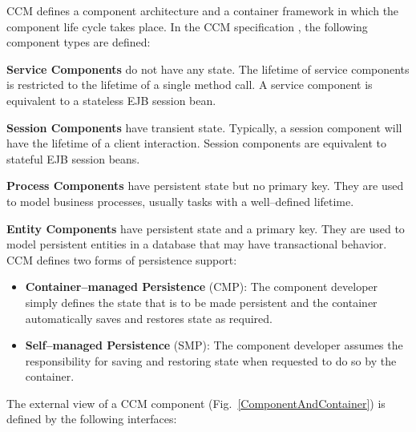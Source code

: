 \noindent
CCM defines a component 
architecture and a container framework in which the component life cycle takes
place. 
In the CCM specification \cite{CCMSpecification}, the following component 
types are defined:
\begin{description}
\item {\bf Service Components} do not have any state. The lifetime of service
components is restricted to the lifetime of a single method call.
A service component is equivalent to a stateless EJB session bean.

\item {\bf Session Components} have transient state. Typically, a session 
component will have the lifetime of a client interaction.
Session components are equivalent to stateful EJB session beans.

\item {\bf Process Components} have persistent state but no primary key.
They are used to model business processes, usually tasks with a well--defined
lifetime.

\item {\bf Entity Components} have persistent state and a primary key.
They are used to model persistent entities in a database that may have 
transactional behavior.
CCM defines two forms of persistence support:
	\begin{itemize}
	\item {\bf Container--managed Persistence} (CMP): 
	The component developer simply defines the state that is to be made 
	persistent and the container automatically saves and restores state 
	as required.
	\item {\bf Self--managed Persistence} (SMP): 
	The component developer assumes the responsibility for saving and 
	restoring state when requested to do so by the container.
	\end{itemize}	
\end{description}

\vspace{3mm}
\noindent
The external view of a CCM component (Fig.~\ref{ComponentAndContainer}) 
is defined by the following interfaces:

